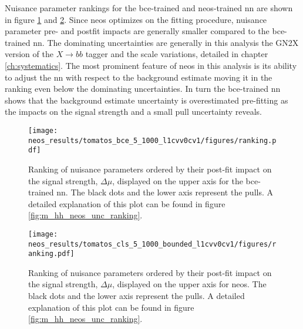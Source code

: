 Nuisance parameter rankings for the \ac{bce}-trained and neos-trained \ac{nn} are shown in figure \ref{fig:neos_valid_ranking_bce} and \ref{fig:neos_valid_ranking_cls}. Since \ac{neos} optimizes on the fitting procedure, nuisance parameter pre- and postfit impacts are generally smaller compared to the \ac{bce}-trained \ac{nn}. The dominating uncertainties are generally in this analysis the GN2X version of the $X\rightarrow bb$ tagger and the scale variations, detailed in chapter \ref{ch:systematics}. The most prominent feature of \ac{neos} in this analysis is its ability to adjust the \ac{nn} with respect to the background estimate moving it in the ranking even below the dominating uncertainties. In turn the \ac{bce}-trained \ac{nn} shows that the background estimate uncertainty is overestimated pre-fitting as the impacts on the signal strength and a small pull uncertainty reveals.

\begin{figure}
    \centering
    \texttt{[image: neos\_results/tomatos\_bce\_5\_1000\_l1cvv0cv1/figures/ranking.pdf]}
    \caption[]{Ranking of nuisance parameters ordered by their post-fit impact on the signal strength, $\Delta\mu$, displayed on the upper axis for the \ac{bce}-trained \ac{nn}. The black dots and the lower axis represent the pulls. A detailed explanation of this plot can be found in figure \ref{fig:m_hh_neos_unc_ranking}.}
    \label{fig:neos_valid_ranking_bce}
\end{figure}
\begin{figure}
    \centering
    \texttt{[image: neos\_results/tomatos\_cls\_5\_1000\_bounded\_l1cvv0cv1/figures/ranking.pdf]}
    \caption[]{Ranking of nuisance parameters ordered by their post-fit impact on the signal strength, $\Delta\mu$, displayed on the upper axis for \ac{neos}. The black dots and the lower axis represent the pulls. A detailed explanation of this plot can be found in figure \ref{fig:m_hh_neos_unc_ranking}.}
    \label{fig:neos_valid_ranking_cls}
\end{figure}

